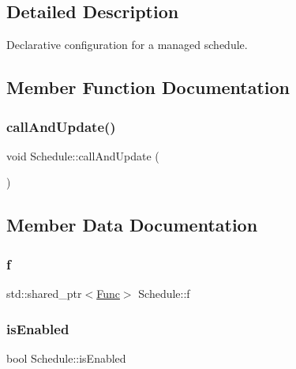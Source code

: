 \subsection{Detailed Description}
Declarative configuration for a managed schedule. 

\subsection{Member Function Documentation}
\mbox{\label{struct_schedule_a13d8ce84c7b38bf5366e5512e2a55e23}} 
\subsubsection{\texorpdfstring{call\+And\+Update()}{callAndUpdate()}}
{\footnotesize\ttfamily void Schedule\+::call\+And\+Update (\begin{DoxyParamCaption}{ }\end{DoxyParamCaption})}



\subsection{Member Data Documentation}
\mbox{\label{struct_schedule_a9d9c9f5ecb6213eea85e061b900ac398}} 
\subsubsection{\texorpdfstring{f}{f}}
{\footnotesize\ttfamily std\+::shared\+\_\+ptr$<$\mbox{\hyperlink{_scheduler_8h_a2125a5a2949d6ee13163b671159c0d4d}{Func}}$>$ Schedule\+::f}

\mbox{\label{struct_schedule_a799716253aaa56ab67ceacee1a727a28}} 
\subsubsection{\texorpdfstring{is\+Enabled}{isEnabled}}
{\footnotesize\ttfamily bool Schedule\+::is\+Enabled}

\mbox{\label{struct_schedule_a63741d77dabb232150e334168a4c72c2}} 
